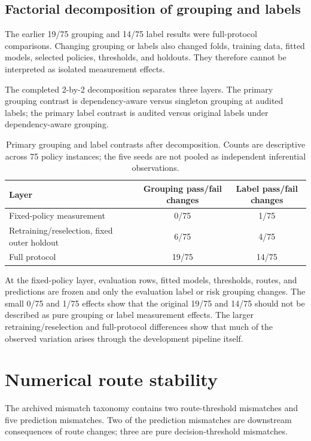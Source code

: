 \documentclass[11pt]{article}
\begin{document}
\subsection{Factorial decomposition of grouping and labels}
The earlier 19/75 grouping and 14/75 label results were full-protocol comparisons. Changing grouping or labels also changed folds, training data, fitted models, selected policies, thresholds, and holdouts. They therefore cannot be interpreted as isolated measurement effects.

The completed 2-by-2 decomposition separates three layers. The primary grouping contrast is dependency-aware versus singleton grouping at audited labels; the primary label contrast is audited versus original labels under dependency-aware grouping.

\begin{table}[h]
\centering
\caption{Primary grouping and label contrasts after decomposition. Counts are descriptive across 75 policy instances; the five seeds are not pooled as independent inferential observations.}
\begin{tabular}{lcc}
\toprule
Layer & Grouping pass/fail changes & Label pass/fail changes \\
\midrule
Fixed-policy measurement & 0/75 & 1/75 \\
Retraining/reselection, fixed outer holdout & 6/75 & 4/75 \\
Full protocol & 19/75 & 14/75 \\
\bottomrule
\end{tabular}
\end{table}

At the fixed-policy layer, evaluation rows, fitted models, thresholds, routes, and predictions are frozen and only the evaluation label or risk grouping changes. The small 0/75 and 1/75 effects show that the original 19/75 and 14/75 should not be described as pure grouping or label measurement effects. The larger retraining/reselection and full-protocol differences show that much of the observed variation arises through the development pipeline itself.

\section{Numerical route stability}
The archived mismatch taxonomy contains two route-threshold mismatches and five prediction mismatches. Two of the prediction mismatches are downstream consequences of route changes; three are pure decision-threshold mismatches.
\end{document}
